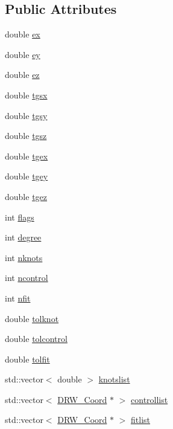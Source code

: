 \subsection*{Public Attributes}
\begin{DoxyCompactItemize}
\item 
double \hyperlink{class_d_r_w___spline_a7d2455d56e3de91a85a7afd1a5b34dfe}{ex}
\item 
double \hyperlink{class_d_r_w___spline_a937a3c0c4450e383de5ebbbbc892d1ad}{ey}
\item 
double \hyperlink{class_d_r_w___spline_ad3ad8a265fbc8c07bc06f8939a8a31a6}{ez}
\item 
double \hyperlink{class_d_r_w___spline_af669678833d9334001f372ef3e459063}{tgsx}
\item 
double \hyperlink{class_d_r_w___spline_a0d22ecfcfa1ccdf83d3799555b808fb6}{tgsy}
\item 
double \hyperlink{class_d_r_w___spline_a432ab2ee17f00fe8c3537f3ab12f0524}{tgsz}
\item 
double \hyperlink{class_d_r_w___spline_ae6195201183d629d458d820417587197}{tgex}
\item 
double \hyperlink{class_d_r_w___spline_a5bbb13c6219350335c353b86755adcea}{tgey}
\item 
double \hyperlink{class_d_r_w___spline_acfe280748cc843881dffd17430a2be37}{tgez}
\item 
int \hyperlink{class_d_r_w___spline_a49110f44d95d47090449c56beaaac3ca}{flags}
\item 
int \hyperlink{class_d_r_w___spline_af60e9efc3c39f418196cca4cc9f8125b}{degree}
\item 
int \hyperlink{class_d_r_w___spline_a5dd173d8176de55d07f00d96dedb0201}{nknots}
\item 
int \hyperlink{class_d_r_w___spline_a73dcf2fa67f1029e4a8d6577b5b51656}{ncontrol}
\item 
int \hyperlink{class_d_r_w___spline_aa9269fcfa581a0e0b25a84fb8dddc96c}{nfit}
\item 
double \hyperlink{class_d_r_w___spline_a62139497f4127ed0d909cbe6cb7d5304}{tolknot}
\item 
double \hyperlink{class_d_r_w___spline_a9ebcea64002b14f0adfae66eadd9f24a}{tolcontrol}
\item 
double \hyperlink{class_d_r_w___spline_a8f91c72942350988a2c3b4652162d613}{tolfit}
\item 
std\+::vector$<$ double $>$ \hyperlink{class_d_r_w___spline_a90bf2f53cd19d98629e393f3cdd36c95}{knotslist}
\item 
std\+::vector$<$ \hyperlink{class_d_r_w___coord}{D\+R\+W\+\_\+\+Coord} $\ast$ $>$ \hyperlink{class_d_r_w___spline_a37b5e6ce7e32c1577fed59c3704c0e0f}{controllist}
\item 
std\+::vector$<$ \hyperlink{class_d_r_w___coord}{D\+R\+W\+\_\+\+Coord} $\ast$ $>$ \hyperlink{class_d_r_w___spline_aeefb7618b8c983a9abe32f974c8ca852}{fitlist}
\end{DoxyCompactItemize}
